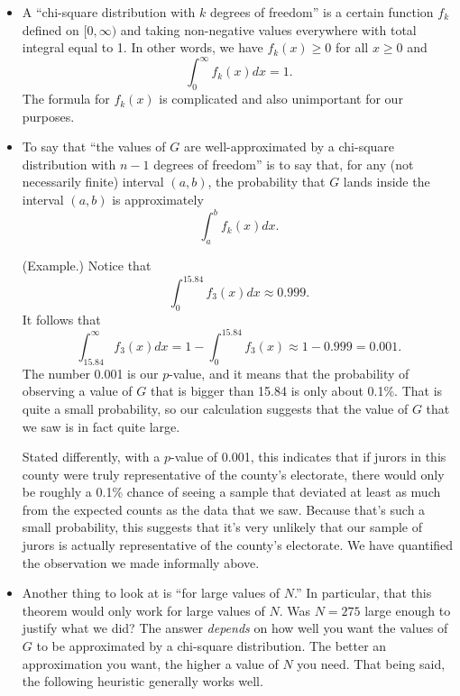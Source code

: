 \documentclass[letterpaper]{article}
\newcommand{\0}{\mathbf{0}}
\begin{document}
\begin{itemize}
    \item A ``chi-square distribution with $k$ degrees of freedom'' is a certain function $f_k$ defined on $[0, \infty)$ and taking non-negative values everywhere with total integral equal to 1. In other words, we have $f_{k}(x) \geq 0$ for all $x \geq 0$ and \[\int_{0}^{\infty} f_{k}(x) dx = 1.\] The formula for $f_{k}(x)$ is complicated and also unimportant for our purposes. 
    
    \item To say that ``the values of $G$ are well-approximated by a chi-square distribution with $n - 1$ degrees of freedom'' is to say that, for any (not necessarily finite) interval $(a, b)$, the probability that $G$ lands inside the interval $(a, b)$ is approximately 
    \[\int_{a}^{b} f_{k}(x) dx.\]

    \begin{mdframed}
        (Example.) Notice that 
        \[\int_0^{15.84} f_{3}(x)dx \approx 0.999.\]
        It follows that 
        \[\int_{15.84}^{\infty} f_{3}(x) dx = 1 - \int_{0}^{15.84} f_3(x) \approx 1 - 0.999 = 0.001.\]
        The number 0.001 is our $p$-value, and it means that the probability of observing a value of $G$ that is bigger than 15.84 is only about 0.1\%. That is quite a small probability, so our calculation suggests that the value of $G$ that we saw is in fact quite large. 
    
        \bigskip 
    
        Stated differently, with a $p$-value of 0.001, this indicates that if jurors in this county were truly representative of the county's electorate, there would only be roughly a 0.1\% chance of seeing a sample that deviated at least as much from the expected counts as the data that we saw. Because that's such a small probability, this suggests that it's very unlikely that our sample of jurors is actually representative of the county's electorate. We have quantified the observation we made informally above.
    \end{mdframed}

    \item Another thing to look at is ``for large values of $N$.'' In particular, that this theorem would only work for large values of $N$. Was $N = 275$ large enough to justify what we did? The answer \emph{depends} on how well you want the values of $G$ to be approximated by a chi-square distribution. The better an approximation you want, the higher a value of $N$ you need. That being said, the following heuristic generally works well. 
\end{itemize}
\end{document}
